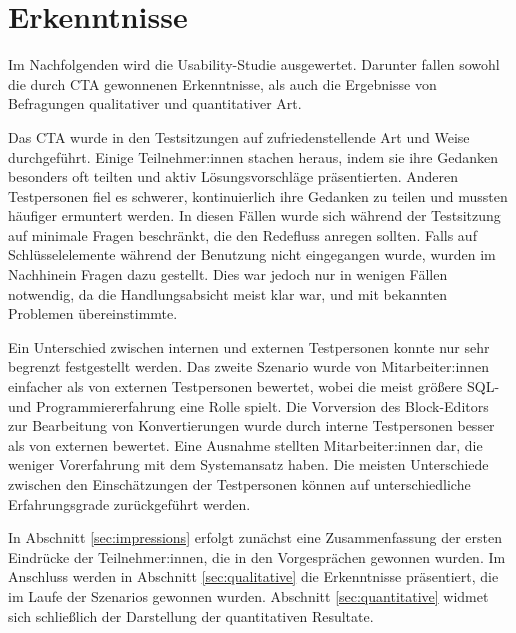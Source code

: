 \section{Erkenntnisse}

Im Nachfolgenden wird die Usability-Studie ausgewertet. Darunter fallen sowohl die durch \acs{CTA} gewonnenen Erkenntnisse, als auch die Ergebnisse von Befragungen qualitativer und quantitativer Art.

Das \ac{CTA} wurde in den Testsitzungen auf zufriedenstellende Art und Weise durchgeführt. Einige Teilnehmer:innen stachen heraus, indem sie ihre Gedanken besonders oft teilten und aktiv Lösungsvorschläge präsentierten. Anderen Testpersonen fiel es schwerer, kontinuierlich ihre Gedanken zu teilen und mussten häufiger ermuntert werden. In diesen Fällen wurde sich während der Testsitzung auf minimale Fragen beschränkt, die den Redefluss anregen sollten. Falls auf Schlüsselelemente während der Benutzung nicht eingegangen wurde, wurden im Nachhinein Fragen dazu gestellt. Dies war jedoch nur in wenigen Fällen notwendig, da die Handlungsabsicht meist klar war, und mit bekannten Problemen übereinstimmte.

Ein Unterschied zwischen internen und externen Testpersonen konnte nur sehr begrenzt festgestellt werden. Das zweite Szenario wurde von Mitarbeiter:innen einfacher als von externen Testpersonen bewertet, wobei die meist größere \ac{SQL}- und Programmiererfahrung eine Rolle spielt. Die Vorversion des Block-Editors zur Bearbeitung von Konvertierungen wurde durch interne Testpersonen besser als von externen bewertet. Eine Ausnahme stellten Mitarbeiter:innen dar, die weniger Vorerfahrung mit dem Systemansatz haben. Die meisten Unterschiede zwischen den Einschätzungen der Testpersonen können auf unterschiedliche  Erfahrungsgrade zurückgeführt werden.

In Abschnitt \ref{sec:impressions} erfolgt zunächst eine Zusammenfassung der ersten Eindrücke der Teilnehmer:innen, die in den Vorgesprächen gewonnen wurden. Im Anschluss werden in Abschnitt \ref{sec:qualitative} die Erkenntnisse präsentiert, die im Laufe der Szenarios gewonnen wurden. Abschnitt \ref{sec:quantitative} widmet sich schließlich der Darstellung der quantitativen Resultate.
